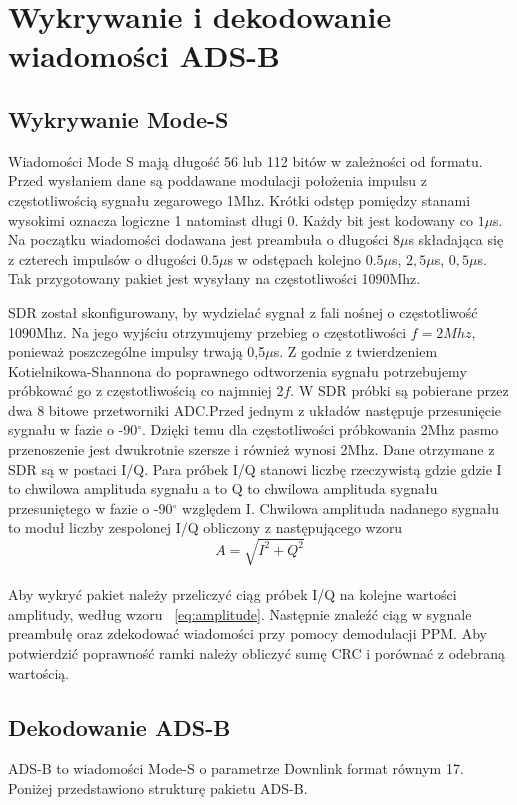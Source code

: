\documentclass[eng,printmode]{mgr}
\begin{document}
\section{Wykrywanie i dekodowanie wiadomości ADS-B}
\subsection*{Wykrywanie Mode-S}
Wiadomości Mode S mają długość 56 lub 112 bitów w zależności od formatu. Przed wysłaniem dane są poddawane modulacji położenia impulsu z częstotliwością sygnału zegarowego 1Mhz. Krótki odstęp pomiędzy stanami wysokimi oznacza logiczne 1 natomiast długi 0. 
Każdy bit jest kodowany co $1\mu$s. Na początku wiadomości dodawana jest preambuła o długości $8\mu$s składająca się z czterech impulsów o długości $0.5\mu$s w odstępach kolejno $0.5\mu$s, $2,5\mu$s, $0,5\mu$s. Tak przygotowany pakiet jest wysyłany na częstotliwości 1090Mhz.


SDR został skonfigurowany, by wydzielać sygnał z fali nośnej o częstotliwość 1090Mhz.
Na jego wyjściu otrzymujemy przebieg o częstotliwości $f=2Mhz$, ponieważ poszczególne impulsy trwają 0,5$\mu$s. Z godnie z twierdzeniem Kotielnikowa-Shannona do poprawnego odtworzenia sygnału potrzebujemy próbkować go z częstotliwością co najmniej $2f$. W SDR próbki są pobierane przez dwa 8 bitowe przetworniki ADC.Przed jednym z układów następuje przesunięcie sygnału w fazie o -90$^\circ$. Dzięki temu dla częstotliwości próbkowania 2Mhz pasmo przenoszenie jest dwukrotnie szersze i również wynosi 2Mhz. Dane otrzymane z SDR są w postaci I/Q. Para próbek I/Q stanowi liczbę rzeczywistą gdzie gdzie I to chwilowa amplituda sygnału a to Q to chwilowa amplituda sygnału przesuniętego w fazie o -90$^\circ$ względem I. Chwilowa amplituda nadanego sygnału to moduł liczby zespolonej I/Q obliczony z następującego wzoru
\\
\begin{equation}
\label{eq:amplitude}
A = \sqrt{I^2 + Q^2}
\end{equation}
\\
Aby wykryć pakiet należy przeliczyć ciąg próbek I/Q na kolejne wartości amplitudy, według wzoru ~\ref{eq:amplitude}. Następnie znaleźć ciąg w sygnale preambułę oraz zdekodować wiadomości przy pomocy demodulacji PPM. Aby potwierdzić poprawność ramki należy obliczyć sumę CRC i porównać z odebraną wartością.
\\

\subsection*{Dekodowanie ADS-B}
ADS-B to wiadomości Mode-S o parametrze Downlink format równym 17. Poniżej przedstawiono strukturę pakietu ADS-B.
\end{document}
